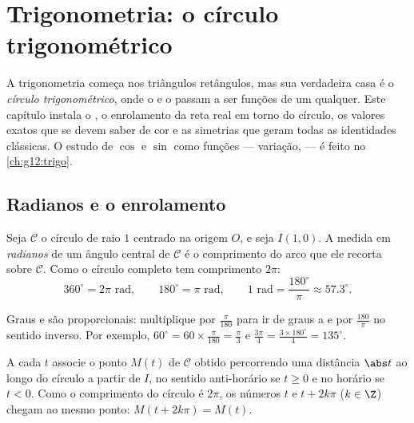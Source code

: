 \chapter{Trigonometria: o círculo trigonométrico}\label{ch:g11:trigo}

A trigonometria começa nos triângulos retângulos, mas sua verdadeira casa
é o \emph{círculo trigonométrico}, onde o  e o  passam a ser
funções de um  qualquer. Este capítulo instala o , o
enrolamento da reta real em torno do círculo, os valores exatos que se
devem saber de cor e as simetrias que geram todas as identidades
clássicas. O estudo de $\cos$ e $\sin$ como funções --- variação,
 --- é feito no \cref{ch:g12:trigo}.

\section{Radianos e o enrolamento}

\begin{definition}[Radiano]\label{def:g11:trigo:radian}
Seja $\mathcal C$ o círculo de raio $1$ centrado na origem $O$, e seja
$I(1, 0)$. A medida em \emph{radianos} de um ângulo
central de $\mathcal C$ é o comprimento do arco que ele recorta sobre
$\mathcal C$. Como o círculo completo tem comprimento $2\pi$:
\[
360^\circ = 2\pi \text{ rad},
\qquad
180^\circ = \pi \text{ rad},
\qquad
1 \text{ rad} = \frac{180^\circ}{\pi} \approx 57.3^\circ .
\]
\end{definition}

\begin{method}[Converter]\label{met:g11:trigo:convert}
Graus e  são proporcionais: multiplique por $\frac{\pi}{180}$
para ir de graus a  e por $\frac{180}{\pi}$ no sentido inverso.
Por exemplo, $60^\circ = 60 \times \frac{\pi}{180} = \frac{\pi}{3}$ e
$\frac{3\pi}{4} = \frac{3 \times 180^\circ}{4} = 135^\circ$.
\end{method}

\begin{definition}\label{def:g11:trigo:winding}
A cada  $t$ associe o ponto $M(t)$ de $\mathcal C$ obtido
percorrendo uma distância $\abs t$ ao longo do círculo a partir de $I$,
no sentido anti-horário se $t \geq 0$ e no horário se $t < 0$. Como o
comprimento do círculo é $2\pi$, os números $t$ e $t + 2k\pi$
($k \in \Z$) chegam ao mesmo ponto: $M(t + 2k\pi) = M(t)$.
\end{definition}

